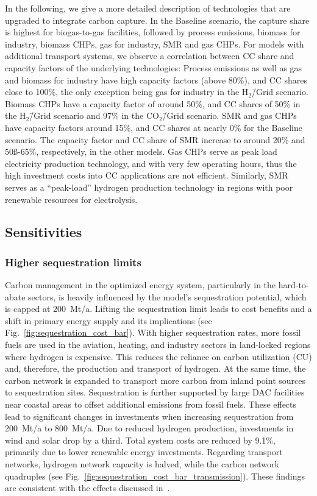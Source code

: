 \documentclass[twocolumn]{article}
\newcommand{\baselinescenario}{Baseline scenario}
\newcommand{\carbonscenario}{CO$_2$\=/Grid scenario}
\newcommand{\hydrogenscenario}{H$_2$\=/Grid scenario}
\begin{document}
In the following, we give a more detailed description of technologies that are upgraded to integrate carbon capture.
In the \baselinescenario{}, the capture share is highest for biogas-to-gas facilities, followed by process emissions, biomass for industry, biomass CHPs, gas for industry, SMR and gas CHPs. For models with additional transport systems, we observe a correlation between CC share and capacity factors of the underlying technologies: Process emissions as well as gas and biomass for industry have high capacity factors (above 80\%), and CC shares close to 100\%, the only exception being gas for industry in the \hydrogenscenario{}. Biomass CHPs have a capacity factor of around 50\%, and CC shares of 50\% in the \hydrogenscenario{} and 97\% in the \carbonscenario{}. SMR and gas CHPs have capacity factors around 15\%, and CC shares at nearly 0\% for the \baselinescenario{}. The capacity factor and CC share of SMR increase to around 20\% and 50ß-65\%, respectively, in the other models. Gas CHPs serve as peak load electricity production technology, and with very few operating hours, thus the high investment costs into CC applications are not efficient. Similarly, SMR serves as a ``peak-load'' hydrogen production technology in regions with poor renewable resources for electrolysis.

\clearpage
\subsection{Sensitivities}
\label{sec:sensitivities}


\subsubsection*{Higher sequestration limits}
\label{sec:higher_sequestration}
Carbon management in the optimized energy system, particularly in the hard-to-abate sectors, is heavily influenced by the model's sequestration potential, which is capped at 200~Mt/a. Lifting the sequestration limit leads to cost benefits and a shift in primary energy supply and its implications (see Fig.~\ref{fig:sequestration_cost_bar}). With higher sequestration rates, more fossil fuels are used in the aviation, heating, and industry sectors in land-locked regions where hydrogen is expensive. This reduces the reliance on carbon utilization (CU) and, therefore, the production and transport of hydrogen. At the same time, the carbon network is expanded to transport more carbon from inland point sources to sequestration sites. Sequestration is further supported by large DAC facilities near coastal areas to offset additional emissions from fossil fuels.
These effects lead to significant changes in investments when increasing sequestration from 200~Mt/a to 800~Mt/a. Due to reduced hydrogen production, investments in wind and solar drop by a third. Total system costs are reduced by 9.1\%, primarily due to lower renewable energy investments. Regarding transport networks, hydrogen network capacity is halved, while the carbon network quadruples (see Fig.~\ref{fig:sequestration_cost_bar_transmission}). These findings are consistent with the effects discussed in~\cite{hofmannDesigningCO2Network2023}.
\end{document}

